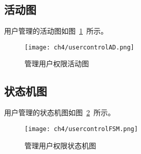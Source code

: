 \subsection{活动图}
用户管理的活动图如图~\ref{fig:usercontrolAD}~所示。
\begin{figure}[htbp]
    \centering
    \texttt{[image: ch4/usercontrolAD.png]}
    \caption{管理用户权限活动图}\label{fig:usercontrolAD}
    \vspace{\baselineskip} %
\end{figure}
\subsection{状态机图}
用户管理的状态机图如图~\ref{fig:usercontrolFSM}~所示。
\begin{figure}[htbp]
    \centering
    \texttt{[image: ch4/usercontrolFSM.png]}
    \caption{管理用户权限状态机图}\label{fig:usercontrolFSM}
    \vspace{\baselineskip} %
\end{figure}